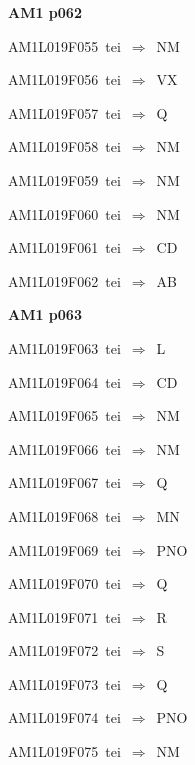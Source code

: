 \par\vfill\eject
{\bf\hfill AM1 p062\hfill\hbox{}}\par\bigskip
{\sixrm AM1L019F055\ {\sixit tei}\ }$\Rightarrow$\ NM\par\smallskip
{\sixrm AM1L019F056\ {\sixit tei}\ }$\Rightarrow$\ VX\par\smallskip
{\sixrm AM1L019F057\ {\sixit tei}\ }$\Rightarrow$\ Q\par\smallskip
{\sixrm AM1L019F058\ {\sixit tei}\ }$\Rightarrow$\ NM\par\smallskip
{\sixrm AM1L019F059\ {\sixit tei}\ }$\Rightarrow$\ NM\par\smallskip
{\sixrm AM1L019F060\ {\sixit tei}\ }$\Rightarrow$\ NM\par\smallskip
{\sixrm AM1L019F061\ {\sixit tei}\ }$\Rightarrow$\ CD\par\smallskip
{\sixrm AM1L019F062\ {\sixit tei}\ }$\Rightarrow$\ AB\par\smallskip

\par\vfill\eject
{\bf\hfill AM1 p063\hfill\hbox{}}\par\bigskip
{\sixrm AM1L019F063\ {\sixit tei}\ }$\Rightarrow$\ L\par\smallskip
{\sixrm AM1L019F064\ {\sixit tei}\ }$\Rightarrow$\ CD\par\smallskip
{\sixrm AM1L019F065\ {\sixit tei}\ }$\Rightarrow$\ NM\par\smallskip
{\sixrm AM1L019F066\ {\sixit tei}\ }$\Rightarrow$\ NM\par\smallskip
{\sixrm AM1L019F067\ {\sixit tei}\ }$\Rightarrow$\ Q\par\smallskip
{\sixrm AM1L019F068\ {\sixit tei}\ }$\Rightarrow$\ MN\par\smallskip
{\sixrm AM1L019F069\ {\sixit tei}\ }$\Rightarrow$\ PNO\par\smallskip
{\sixrm AM1L019F070\ {\sixit tei}\ }$\Rightarrow$\ Q\par\smallskip
{\sixrm AM1L019F071\ {\sixit tei}\ }$\Rightarrow$\ R\par\smallskip
{\sixrm AM1L019F072\ {\sixit tei}\ }$\Rightarrow$\ S\par\smallskip
{\sixrm AM1L019F073\ {\sixit tei}\ }$\Rightarrow$\ Q\par\smallskip
{\sixrm AM1L019F074\ {\sixit tei}\ }$\Rightarrow$\ PNO\par\smallskip
{\sixrm AM1L019F075\ {\sixit tei}\ }$\Rightarrow$\ NM\par\smallskip

